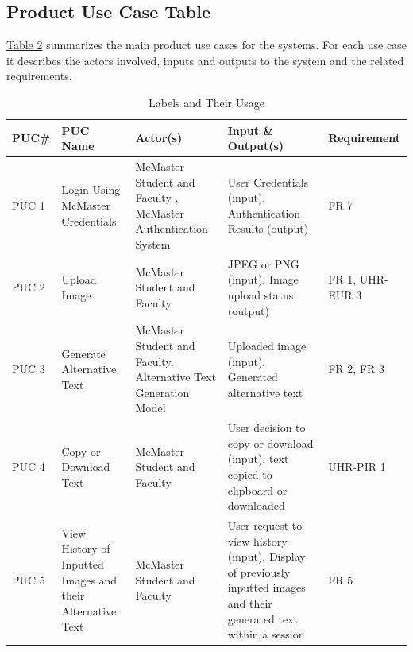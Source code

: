 \documentclass[12pt]{article}
\begin{document}
\subsection{Product Use Case Table}
\href{tab:product-use}{Table 2} summarizes the main product use cases for the systems. For each use case it describes the actors involved, inputs and outputs to the system and the related requirements. 
  \label{tab:product-use}
    \begin{table}[H]
      \centering
      \caption{Labels and Their Usage}
      \begin{tabular}{|p{1.3cm}|p{2.5cm}|p{3cm}|p{4cm}|p{2.6cm}|}
      \hline
      \textbf{PUC\#} & \textbf{PUC Name} & \textbf{Actor(s)} & \textbf{Input \& Output(s)} & \textbf{Requirement} \\ 
      \hline 
      PUC 1 & Login Using McMaster Credentials &  McMaster Student and Faculty , McMaster Authentication System & User Credentials (input), Authentication Results (output) & FR 7 \\
      \hline 
      PUC 2 & Upload Image & McMaster Student and Faculty & JPEG or PNG (input), Image upload status (output) & FR 1, UHR-EUR 3 \\
      \hline 
      PUC 3 & Generate Alternative Text &  McMaster Student and Faculty, Alternative Text Generation Model & Uploaded image (input), Generated alternative text  & FR 2, FR 3\\
      \hline
      PUC 4 & Copy or Download Text & McMaster Student and Faculty & User decision to copy or download (input), text copied to clipboard or downloaded & UHR-PIR 1\\ 
      \hline
      PUC 5 & View History of Inputted Images and their Alternative Text & McMaster Student and Faculty & User request to view history (input), Display of previously inputted images and their generated text within a session & FR 5\\
      \hline
\end{tabular}
\end{table}
\end{document}
